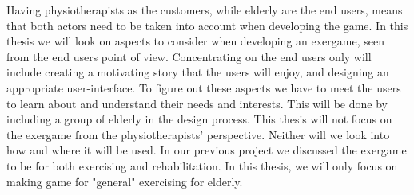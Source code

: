 Having physiotherapists as the customers, while elderly are the end users, means that both actors need to be taken into account when developing the game. In this thesis we will look on aspects to consider when developing an exergame, seen from the end users point of view. Concentrating on the end users only will include creating a motivating story that the users will enjoy, and designing an appropriate user-interface. To figure out these aspects we have to meet the users to learn about and understand their needs and interests. This will be done by including a group of elderly in the design process. This thesis will not focus on the exergame from the physiotherapists' perspective. Neither will we look into how and where it will be used. In our previous project we discussed the exergame to be for both exercising and rehabilitation. In this thesis, we will only focus on making game for "general" exercising for elderly. 

